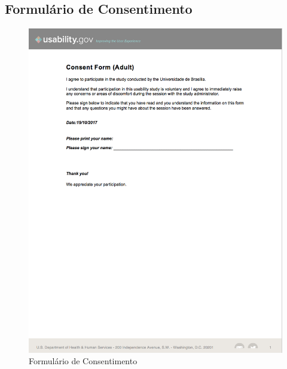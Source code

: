 \begin{apendicesenv}
\partapendices

\chapter{Formulário de Consentimento}

\graphicspath{{figuras/}}
\begin{figure}[h]
\centering
\includegraphics[scale=0.70]{consent_form.png}
\caption{Formulário de Consentimento }
\label{img:consentiment}
\end{figure}


\end{apendicesenv}
